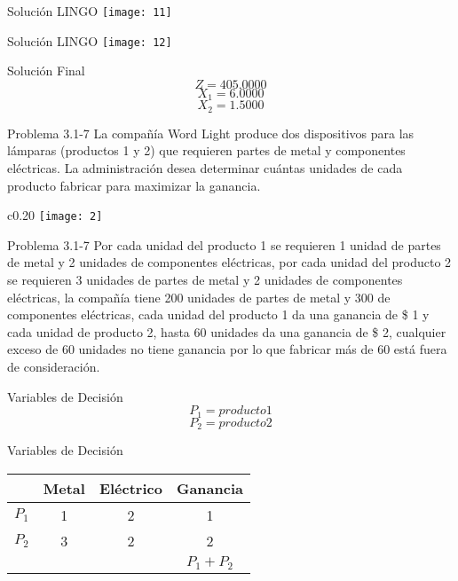 \documentclass{beamer}
\begin{document}
\begin{frame}[fragile]{Soluci\'on LINGO}
\texttt{[image: 11]}
\end{frame}

\begin{frame}[fragile]{Soluci\'on LINGO}
    \texttt{[image: 12]}
\end{frame}

\begin{frame}[fragile]{Soluci\'on Final}
\[Z = 405.0000\]
\[X_{1} = 6.0000\]
\[X_{2} = 1.5000\]
\end{frame}

\begin{frame}[t,fragile]{Problema 3.1-7 }
La compañ\'ia Word Light produce dos dispositivos para las l\'amparas (productos 1 y 2) que requieren partes de metal y componentes el\'ectricas. La administraci\'on desea determinar cu\'antas unidades de cada producto fabricar para maximizar la ganancia. 
\begin{wrapfigure}{c}{0.20\textwidth}
    \centering
    \texttt{[image: 2]}
\end{wrapfigure}
\end{frame}
\begin{frame}[t,fragile]{Problema 3.1-7 }
Por cada unidad del producto 1 se requieren 1 unidad de partes de metal y 2 unidades de componentes el\'ectricas, por cada unidad del producto 2 se requieren 3 unidades de partes de metal y 2 unidades de componentes el\'ectricas, la compañ\'ia tiene 200 unidades de partes de metal y 300 de componentes el\'ectricas, cada unidad del producto 1 da una ganancia de \$ 1 y cada unidad de producto 2, hasta 60 unidades da una ganancia de \$ 2, cualquier exceso de 60 unidades no tiene ganancia por lo que fabricar m\'as de 60 est\'a fuera de consideraci\'on. \\
\end{frame}

\begin{frame}[fragile]{Variables de Decisi\'on}
\[P_{1} = producto 1\]
\[P_{2} = producto 2\]
\end{frame}
\begin{frame}[fragile]{Variables de Decisi\'on}
\begin{tabular}{|c|c|c|c|}
\hline 
  & Metal & El\'ectrico & Ganancia \\ 
\hline 
\(P_{1}\) & 1 & 2 & 1 \\ 
\hline 
\(P_{2}\) & 3 & 2 & 2 \\ 
\hline 
 &   &   & \(P_{1} + P_{2}\) \\ 
\hline 
\end{tabular} 

\end{frame}
\end{document}
